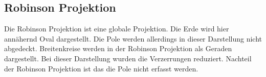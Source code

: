 \subsection{Robinson Projektion}
\label{sec:robinson}
Die Robinson Projektion ist eine globale Projektion. Die Erde wird hier annähernd Oval dargestellt. Die Pole werden allerdings in dieser Darstellung nicht abgedeckt. Breitenkreise werden in der Robinson Projektion als Geraden dargestellt. Bei dieser Darstellung wurden die Verzerrungen reduziert. Nachteil der Robinson Projektion ist das die Pole nicht erfasst werden.
